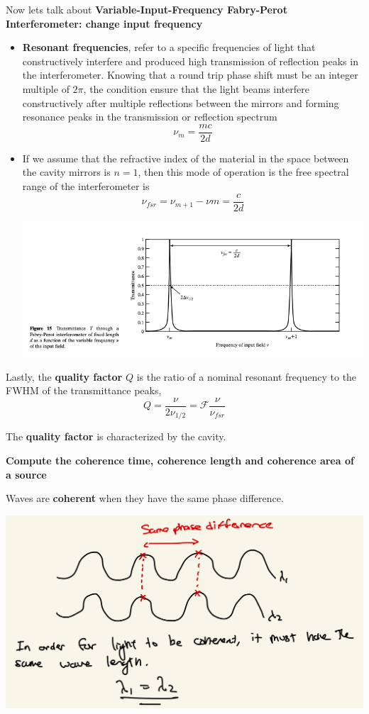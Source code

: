 \documentclass[10pt]{article}
\begin{document}
Now lets talk about \textbf{Variable-Input-Frequency Fabry-Perot Interferometer: change input frequency}
\begin{itemize}
    \item \textbf{Resonant frequencies}, refer to a specific frequencies of light that constructively interfere and produced high transmission of reflection peaks in the interferometer. Knowing that a round trip phase shift must be an integer multiple of $2\pi$, the condition ensure that the light beams interfere constructively after multiple reflections between the mirrors and forming resonance peaks in the transmission or reflection spectrum
    \[\nu_m = \frac{mc}{2d}\]
    \item If we assume that the refractive index of the material in the space between the cavity mirrors is $n=1$, then this mode of operation is the free spectral range of the interferometer is 
    \[\nu_{fsr} = \nu_{m+1} - \nu{m} = \frac{c}{2d}\]
    \begin{center}
        \includegraphics*[scale=.5]{imgs/frequency-vs-transmittance.png}
    \end{center}
\end{itemize}

Lastly, the \textbf{quality factor} $Q$ is the ratio of a nominal resonant frequency to the FWHM of the transmittance peaks,
\[Q = \frac{\nu}{2\nu_{1/2}} = \mathcal{F}\frac{\nu}{\nu_{fsr}}\]

The \textbf{quality factor} is characterized by the cavity.

\newblock

\textbf{Compute the coherence time, coherence length and coherence area of a source}

Waves are \textbf{coherent} when they have the same phase difference.
\begin{center}
    \includegraphics*[scale = .2]{imgs/coherence.jpeg}
\end{center}
\end{document}
